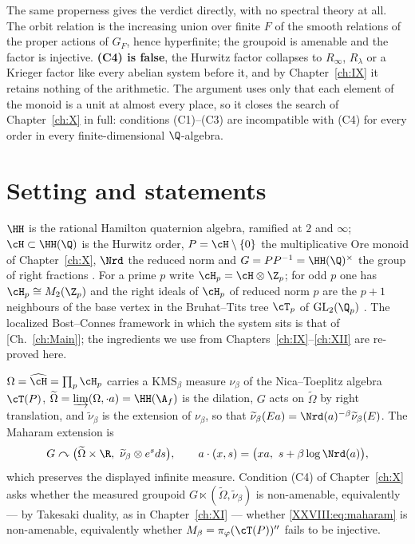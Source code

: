 \begin{summary}
The same properness gives the verdict directly, with no spectral theory at all. The orbit relation
is the increasing union over finite $F$ of the smooth relations of the proper actions of $G_F$,
hence hyperfinite; the groupoid is amenable and the factor is injective. \textbf{(C4) is false},
the Hurwitz factor collapses to $R_\infty$, $R_\lambda$ or a Krieger factor like every abelian
system before it, and by Chapter~\ref{ch:IX} it retains nothing of the arithmetic. The argument uses only
that each element of the monoid is a unit at almost every place, so it closes the search of
Chapter~\ref{ch:X} in full: conditions (C1)--(C3) are incompatible with (C4) for every order in every
finite-dimensional $\Q$-algebra.
\end{summary}


\section{Setting and statements}\label{XXVIII:sec:setup}

$\HH$ is the rational Hamilton quaternion algebra, ramified at $2$ and $\infty$;
$\cH\subset\HH(\Q)$ is the Hurwitz order, $P=\cH\setminus\{0\}$ the multiplicative Ore monoid of
Chapter~\ref{ch:X}, $\Nrd$ the reduced norm and $G=PP^{-1}=\HH(\Q)^\times$ the group of right fractions
\cite{Vigneras}. For a prime $p$ write $\cH_p=\cH\otimes\Z_p$; for odd $p$ one has
$\cH_p\cong M_2(\Z_p)$ and the right ideals of $\cH_p$ of reduced norm $p$ are the $p+1$ neighbours
of the base vertex in the Bruhat--Tits tree $\cT_p$ of $\mathrm{GL}_2(\Q_p)$ \cite{Serre}. The
localized Bost--Connes framework in which the system sits is that of [Ch.~\ref{ch:Main}]; the ingredients
we use from Chapters~\ref{ch:IX}--\ref{ch:XII} are re-proved here.

\begin{hypothesis}\label{XXVIII:hyp:model}
$\Omega=\widehat\cH=\prod_p\cH_p$ carries a $\mathrm{KMS}_\beta$ measure $\nu_\beta$ of the
Nica--Toeplitz algebra $\cT(P)$, $\widetilde\Omega=\varinjlim(\Omega,\cdot a)=\HH(\A_f)$ is the
dilation, $G$ acts on $\widetilde\Omega$ by right translation, and $\widetilde\nu_\beta$ is the
extension of $\nu_\beta$, so that
$\widetilde\nu_\beta(Ea)=\Nrd(a)^{-\beta}\widetilde\nu_\beta(E)$. The Maharam extension is
\begin{equation}\label{XXVIII:eq:maharam}
G\curvearrowright\bigl(\widetilde\Omega\times\R,\ \widetilde\nu_\beta\otimes e^{s}ds\bigr),
\qquad a\cdot(x,s)=\bigl(xa,\ s+\beta\log\Nrd(a)\bigr),
\end{equation}
which preserves the displayed infinite measure. Condition (C4) of Chapter~\ref{ch:X} asks whether the
measured groupoid $G\ltimes(\widetilde\Omega,\widetilde\nu_\beta)$ is non-amenable, equivalently
--- by Takesaki duality, as in Chapter~\ref{ch:XI} --- whether \eqref{XXVIII:eq:maharam} is non-amenable,
equivalently whether $M_\beta=\pi_\varphi(\cT(P))''$ fails to be injective.
\end{hypothesis}

